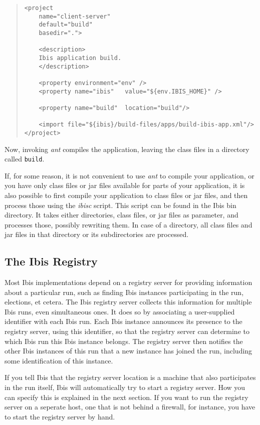 \documentclass[10pt]{article}
\newcommand{\mysubsection}[1]{\subsection{#1}\label{#1}}
\begin{document}
{\small
\begin{quote}
\begin{verbatim}
<project
    name="client-server"
    default="build"
    basedir=".">

    <description>
    Ibis application build.
    </description>

    <property environment="env" />
    <property name="ibis"   value="${env.IBIS_HOME}" />

    <property name="build"  location="build"/>

    <import file="${ibis}/build-files/apps/build-ibis-app.xml"/>
</project>
\end{verbatim}
\end{quote}
}

Now, invoking \emph{ant} compiles the application, leaving the class files
in a directory called \texttt{build}.

If, for some reason, it is not convenient to use \emph{ant} to compile
your application, or you have only class files or jar files available
for parts of your application, it is also possible to first compile
your application to class files or jar files, and then process those
using the \emph{ibisc} script. This script can be found in the Ibis
bin directory. It takes either directories, class files, or jar files
as parameter, and processes those, possibly rewriting them. In case
of a directory, all class files and jar files in that directory or
its subdirectories are processed.

\mysubsection{The Ibis Registry}

Most Ibis implementations depend on a registry server for providing
information about a particular run, such as finding Ibis instances
participating in the run, elections, et cetera.
The Ibis registry server collects this information for multiple Ibis
runs, even simultaneous ones. It does so by associating a user-supplied
identifier with each Ibis run. Each Ibis instance announces its
presence to the registry server, using this identifier, so that the
registry server can determine to which Ibis run this Ibis instance belongs.
The registry server then notifies the other Ibis instances of this run that
a new instance has joined the run, including some identification of
this instance.

If you tell Ibis that the registry server location is a machine that also
participates in the run itself, Ibis will automatically try to start
a registry server. How you can specify this is explained in the next section.
If you want to run the registry server on a seperate host, one that is not
behind a firewall, for instance, you have to start the registry server by
hand.
\end{document}
